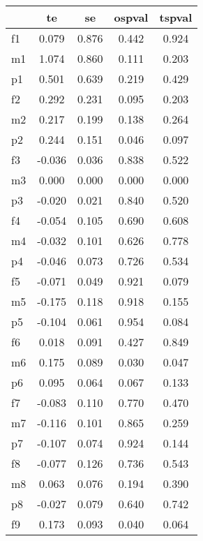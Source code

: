 \begin{table}[htbp]
\begin{tabular}{lcccc} \hline \hline
 & te  & se  & ospval  & tspval  \\  \hline 
f1 &     0.079 &     0.876 &     0.442 &     0.924 \\  
m1 &     1.074 &     0.860 &     0.111 &     0.203 \\  
p1 &     0.501 &     0.639 &     0.219 &     0.429 \\  
f2 &     0.292 &     0.231 &     0.095 &     0.203 \\  
m2 &     0.217 &     0.199 &     0.138 &     0.264 \\  
p2 &     0.244 &     0.151 &     0.046 &     0.097 \\  
f3 &    -0.036 &     0.036 &     0.838 &     0.522 \\  
m3 &     0.000 &     0.000 &     0.000 &     0.000 \\  
p3 &    -0.020 &     0.021 &     0.840 &     0.520 \\  
f4 &    -0.054 &     0.105 &     0.690 &     0.608 \\  
m4 &    -0.032 &     0.101 &     0.626 &     0.778 \\  
p4 &    -0.046 &     0.073 &     0.726 &     0.534 \\  
f5 &    -0.071 &     0.049 &     0.921 &     0.079 \\  
m5 &    -0.175 &     0.118 &     0.918 &     0.155 \\  
p5 &    -0.104 &     0.061 &     0.954 &     0.084 \\  
f6 &     0.018 &     0.091 &     0.427 &     0.849 \\  
m6 &     0.175 &     0.089 &     0.030 &     0.047 \\  
p6 &     0.095 &     0.064 &     0.067 &     0.133 \\  
f7 &    -0.083 &     0.110 &     0.770 &     0.470 \\  
m7 &    -0.116 &     0.101 &     0.865 &     0.259 \\  
p7 &    -0.107 &     0.074 &     0.924 &     0.144 \\  
f8 &    -0.077 &     0.126 &     0.736 &     0.543 \\  
m8 &     0.063 &     0.076 &     0.194 &     0.390 \\  
p8 &    -0.027 &     0.079 &     0.640 &     0.742 \\  
f9 &     0.173 &     0.093 &     0.040 &     0.064 \\  

\end{tabular}
\end{table}
